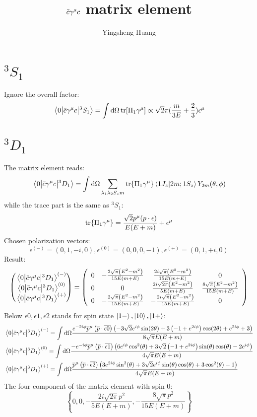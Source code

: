 \documentclass{article}
\title{$\bar c\gm c$ matrix element}
\author{Yingsheng Huang}
\newcommand{\gm}{\gamma^{\mu}}
\newcommand{\la}{\lambda}
\begin{document}
\maketitle
\section{$^3S_1$}
Ignore the overall factor:
$$\mel{0}{\bar c\gm c}{^3S_1}=\int\dd\Omega\tr[\Pi_1\gm]\propto\sqrt{2}\pi(\frac{m}{3 E}+\frac{2}{3})\epsilon^{\mu}$$
\section{$^3D_1$}
The matrix element reads:
$$\mel{0}{\bar c\gm c}{^3D_1}=\int\dd\Omega\sum_{\la_1\la_2 S_zm}\tr{\Pi_1\gm}\braket{1J_z}{2m;1S_z}Y_{2m}(\theta,\phi)$$
while the trace part is the same as $^3S_1$:
$$\tr{\Pi_1\gm}=\frac{\sqrt{2}p^{\mu}(p\cdot\epsilon)}{E(E+m)}+\epsilon^{\mu}$$
Chosen polarization vectors: 
$$\epsilon^{(-)}=(0,1,-i,0),\epsilon^{(0)}=(0,0,0,-1),\epsilon^{(+)}=(0,1,+i,0)$$
Result: 
$$\pmqty{\mel{0}{\bar c\gm c}{^3D_1}^{(-)}\\\mel{0}{\bar c\gm c}{^3D_1}^{(0)}\\\mel{0}{\bar c\gm c}{^3D_1}^{(+)}}=\left(
\begin{array}{cccc}
 0 & -\frac{2 \sqrt{\pi } \left(E^2-m^2\right)}{15 E (m+E)} & \frac{2 i \sqrt{\pi } \left(E^2-m^2\right)}{15 E (m+E)} & 0 \\
 0 & 0 & \frac{2 i \sqrt{2 \pi } \left(E^2-m^2\right)}{5 E (m+E)} & \frac{8 \sqrt{\pi } \left(E^2-m^2\right)}{15 E (m+E)} \\
 0 & -\frac{2 \sqrt{\pi } \left(E^2-m^2\right)}{15 E (m+E)} & -\frac{2 i \sqrt{\pi } \left(E^2-m^2\right)}{15 E (m+E)} & 0 \\
\end{array}
\right)$$
Below $\bar\epsilon0,\bar\epsilon1,\bar\epsilon2$ stands for spin state $\ket{1-},\ket{10},\ket{1+}$:
\begin{align*}
&\mel{0}{\bar c\gm c}{^3D_1}^{(-)}=\int\dd\Omega\frac{e^{-2 i \phi } \overline{p}^{\mu } \left(\overline{p}\cdot
   \overline{\text{$\epsilon $0}}\right) \left(-3 \sqrt{2} e^{i \phi } \sin (2 \theta
   )+3 \left(-1+e^{2 i \phi }\right) \cos (2 \theta )+e^{2 i \phi }+3\right)}{8
   \sqrt{\pi } E (E+m)}\\
&\mel{0}{\bar c\gm c}{^3D_1}^{(0)}=\int\dd\Omega \frac{-e^{-i \phi } \overline{p}^{\mu } \left(\overline{p}\cdot
   \overline{\text{$\epsilon $1}}\right) \left(6 e^{i \phi } \cos ^2(\theta )+3
   \sqrt{2} \left(-1+e^{2 i \phi }\right) \sin (\theta ) \cos (\theta )-2 e^{i \phi
   }\right)}{4 \sqrt{\pi } E (E+m)}\\
&\mel{0}{\bar c\gm c}{^3D_1}^{(+)}=\int\dd\Omega\frac{\overline{p}^{\mu } \left(\overline{p}\cdot \overline{\text{$\epsilon
   $2}}\right) \left(3 e^{2 i \phi } \sin ^2(\theta )+3 \sqrt{2} e^{i \phi } \sin
   (\theta ) \cos (\theta )+3 \cos ^2(\theta )-1\right)}{4 \sqrt{\pi } E (E+m)}
\end{align*}
The four component of the matrix element with spin 0:
   $$\left\{0,0,-\frac{2 i \sqrt{2 \pi } p^2}{5 E (E+m)},-\frac{8 \sqrt{\pi } p^2}{15 E (E+m)}\right\}$$
\end{document}
